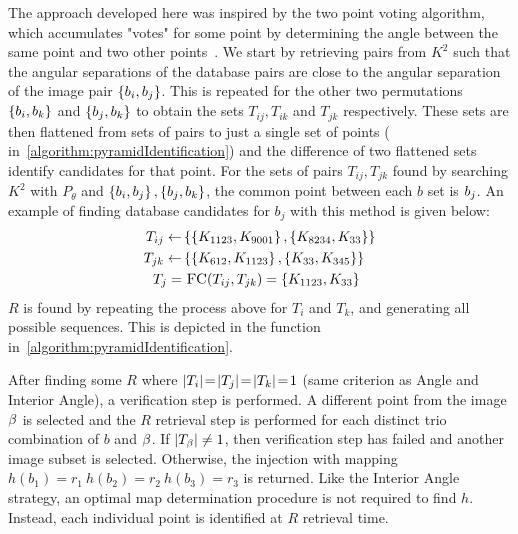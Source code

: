 The approach developed here was inspired by the two point voting algorithm, which accumulates "votes" for some point by
determining the angle between the same point and two other points~\cite{tichy:preliminaryTestsCommericalImagers}.
We start by retrieving pairs from $K^2$ such that the angular separations of the database pairs are
close to the angular separation of the image pair $\left\{ b_i, b_j \right\}$.
This is repeated for the other two permutations $\left\{ b_i, b_k \right\}$ and $\left\{  b_j, b_k  \right\}$ to obtain
the sets $T_{ij}, T_{ik}$ and $T_{jk}$ respectively.
These sets are then flattened from sets of pairs to just a single set of points (
in~\autoref{algorithm:pyramidIdentification}) and the difference of two flattened sets identify candidates for that
point.
For the sets of pairs $T_{ij}, T_{jk}$ found by searching $K^2$ with $P_\theta$ and $\left\{ b_i, b_j \right\},
\left\{ b_j, b_k \right\}$, the common point between each $b$ set is $b_j$.
An example of finding database candidates for $b_j$ with this method is given below:
\begin{equation}
    \begin{aligned}
        T_{ij} \gets& \set{ \set{\vv{K_{1123}}, \vv{K_{9001}}}, \set{\vv{K_{8234}}, \vv{K_{33}}} } \\
        T_{jk} \gets& \set{ \set{\vv{K_{612}}, \vv{K_{1123}}}, \set{\vv{K_{33}}, \vv{K_{345}}} } \\
        T_j =& \  \Call{FC}{T_{ij}, T_{jk}} = \set{\vv{K_{1123}}, \vv{K_{33}}}
    \end{aligned}
\end{equation}
$R$ is found by repeating the process above for $T_i$ and $T_k$, and generating all possible sequences.
This is depicted in the  function in~\autoref{algorithm:pyramidIdentification}.

After finding some $R$ where $\left| T_i \right| \!=\! \left| T_j \right| \!=\! \left| T_k \right| \!=\! 1$ (same criterion as Angle and
Interior Angle), a verification step is performed.
A different point from the image $\beta$ is selected and the $R$ retrieval step is performed for each distinct trio
combination of $b$ and $\beta$.
If $\left| T_\beta \right| \neq 1$, then verification step has failed and another image subset is selected.
Otherwise, the injection with mapping $h(b_1) = r_1 \ h(b_2) = r_2 \ h(b_3) = r_3$ is returned.
Like the Interior Angle strategy, an optimal map determination procedure is not required to find $h$.
Instead, each individual point is identified at $R$ retrieval time.

